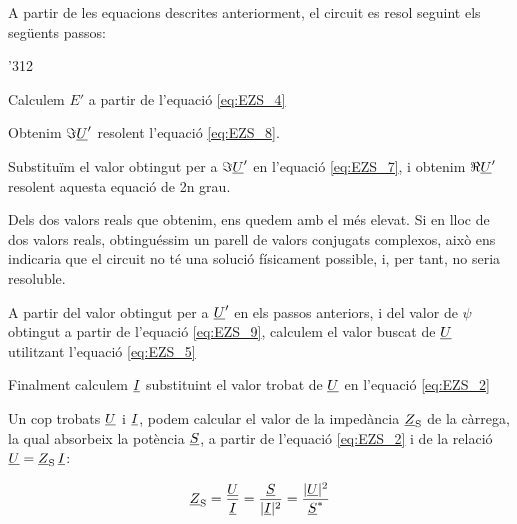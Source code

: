 A partir de les equacions descrites anteriorment, el circuit es resol seguint els següents passos:
\begin{dingautolist}{'312}
   \item Calculem $E'$ a partir de l'equació \eqref{eq:EZS_4}
   \item Obtenim $\Im\underline{U}'$ resolent l'equació \eqref{eq:EZS_8}.
   \item Substituïm el valor obtingut per a $\Im\underline{U}'$ en l'equació \eqref{eq:EZS_7}, i obtenim $\Re\underline{U}'$ resolent aquesta equació de 2n grau.
   \item Dels dos valors reals que obtenim, ens quedem amb el més elevat. Si en lloc de dos valors reals, obtinguéssim un parell de valors conjugats complexos, això ens indicaria que el circuit no té una solució físicament possible, i, per tant, no seria resoluble.
   \item A partir del valor  obtingut per a $\underline{U}'$ en els passos anteriors, i del valor de $\psi$ obtingut a partir de l'equació \eqref{eq:EZS_9}, calculem el valor buscat de $\underline{U}$ utilitzant l'equació \eqref{eq:EZS_5}
   \item Finalment calculem $\underline{I}$ substituint el valor trobat de $\underline{U}$ en l'equació \eqref{eq:EZS_2}
\end{dingautolist}

Un cop trobats $\underline{U}$ i $\underline{I}$, podem calcular el valor de
la impedància  $\underline{Z}_\mathrm{S}$ de la càrrega, la qual absorbeix
la potència $\underline{S}$, a partir de l'equació \eqref{eq:EZS_2} i de
la relació $\underline{U} = \underline{Z}_\mathrm{S} \,\underline{I}$:

\begin{equation}
   \underline{Z}_\mathrm{S} = \frac{\underline{U}}{\underline{I}} =
   \frac{\underline{S}}{|\underline{I}|^2} =
   \frac{|\underline{U}|^2}{\underline{S}^*} \label{eq:EZS 10}
\end{equation}



